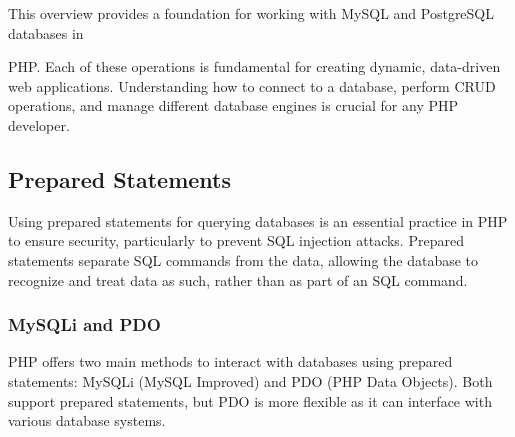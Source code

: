 \documentclass[11pt]{article}
\begin{document}
This overview provides a foundation for working with MySQL and
PostgreSQL databases in

PHP. Each of these operations is fundamental for creating dynamic,
data-driven web applications. Understanding how to connect to a
database, perform CRUD operations, and manage different database engines
is crucial for any PHP developer.

\subsection{Prepared Statements}
\label{sec:org769d5f2}
Using prepared statements for querying databases
is an essential practice in PHP to ensure security, particularly to
prevent SQL injection attacks. Prepared statements separate SQL commands
from the data, allowing the database to recognize and treat data as
such, rather than as part of an SQL command.

\subsubsection{MySQLi and PDO}
\label{sec:orga8a7472}
PHP offers two main methods to interact with databases using prepared
statements: MySQLi (MySQL Improved) and PDO (PHP Data Objects). Both
support prepared statements, but PDO is more flexible as it can
interface with various database systems.
\end{document}
